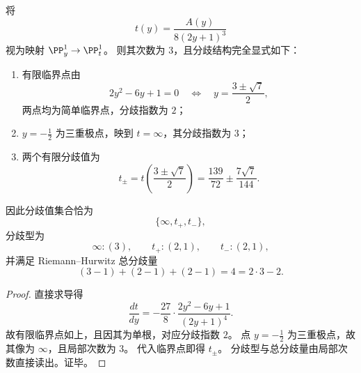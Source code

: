 \begin{theorem}\label{thm:xi-leyang-ty-three-branch-profile}
将
\[
t(y)=\frac{A(y)}{8(2y+1)^3}
\]
视为映射 \(\PP^1_y\to\PP^1_t\)。
则其次数为 \(3\)，且分歧结构完全显式如下：
\begin{enumerate}
  \item 有限临界点由
  \[
  2y^2-6y+1=0
  \quad\Longleftrightarrow\quad
  y=\frac{3\pm\sqrt7}{2},
  \]
  两点均为简单临界点，分歧指数为 \(2\)；
  \item \(y=-\frac12\) 为三重极点，映到 \(t=\infty\)，其分歧指数为 \(3\)；
  \item 两个有限分歧值为
  \[
  t_\pm=t\!\left(\frac{3\pm\sqrt7}{2}\right)=\frac{139}{72}\pm\frac{7\sqrt7}{144}.
  \]
\end{enumerate}
因此分歧值集合恰为
\[
\{\infty,t_+,t_-\},
\]
分歧型为
\[
\infty:(3),\qquad t_+:(2,1),\qquad t_-:(2,1),
\]
并满足 Riemann--Hurwitz 总分歧量
\[
(3-1)+(2-1)+(2-1)=4=2\cdot 3-2.
\]
\end{theorem}
\begin{proof}
直接求导得
\[
\frac{dt}{dy}
=-\frac{27}{8}\cdot\frac{2y^2-6y+1}{(2y+1)^4}.
\]
故有限临界点如上，且因其为单根，对应分歧指数 \(2\)。
点 \(y=-\frac12\) 为三重极点，故其像为 \(\infty\)，且局部次数为 \(3\)。
代入临界点即得 \(t_\pm\)。
分歧型与总分歧量由局部次数直接读出。证毕。
\end{proof}




\endinput
